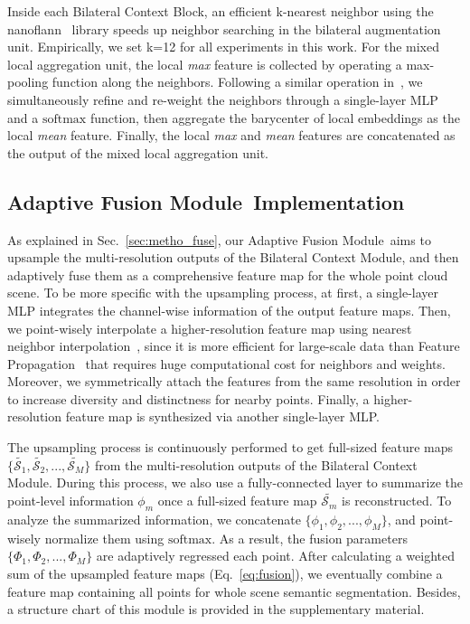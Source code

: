 \documentclass[10pt,twocolumn,letterpaper]{article}
\def\ourencoder{Bilateral Context Module}
\def\ourblock{Bilateral Context Block}
\def\ourdecoder{Adaptive Fusion Module}
\begin{document}
Inside each \ourblock, an efficient k-nearest neighbor using the nanoflann~\cite{blanco2014nanoflann} library speeds up neighbor searching in the bilateral augmentation unit. Empirically, we set k=12 for all experiments in this work. For the mixed local aggregation unit, the local \emph{max} feature is collected by operating a max-pooling function along the neighbors. Following a similar operation in~\cite{hu2020randla}, we simultaneously refine and re-weight the neighbors through a single-layer MLP and a $\mathrm{softmax}$ function, then aggregate the barycenter of local embeddings as the local \emph{mean} feature. Finally, the local \emph{max} and \emph{mean} features are concatenated as the output of the mixed local aggregation unit.

\subsection{\ourdecoder~Implementation}
\label{sec:impl_decoder}
As explained in Sec.~\ref{sec:metho_fuse}, our \ourdecoder~aims to upsample the multi-resolution outputs of the \ourencoder, and then adaptively fuse them as a comprehensive feature map for the whole point cloud scene. To be more specific with the upsampling process, at first, a single-layer MLP integrates the channel-wise information of the output feature maps. Then, we point-wisely interpolate a higher-resolution feature map using nearest neighbor interpolation~\cite{keys1981cubic}, since it is more efficient for large-scale data than Feature Propagation~\cite{qi2017pointnet++} that requires huge computational cost for neighbors and weights. Moreover, we symmetrically attach the features from the same resolution in order to increase diversity and distinctness for nearby points. Finally, a higher-resolution feature map is synthesized via another single-layer MLP.

The upsampling process is continuously performed to get full-sized feature maps $\{\tilde{\mathcal{S}_1}, \tilde{\mathcal{S}_2}, ..., \tilde{\mathcal{S}_M}\}$ from the multi-resolution outputs of the \ourencoder. During this process, we also use a fully-connected layer to summarize the point-level information $\phi_m$ once a full-sized feature map $\tilde{\mathcal{S}_m}$ is reconstructed. To analyze the summarized information, we concatenate $\{\phi_1, \phi_2, ..., \phi_M\}$, and point-wisely normalize them using $\mathrm{softmax}$. As a result, the fusion parameters $\{\Phi_1, \Phi_2, ..., \Phi_M\}$ are adaptively regressed \wrt each point. After calculating a weighted sum of the upsampled feature maps (Eq.~\ref{eq:fusion}), we eventually combine a feature map containing all points for whole scene semantic segmentation. Besides, a structure chart of this module is provided in the supplementary material.
\end{document}
